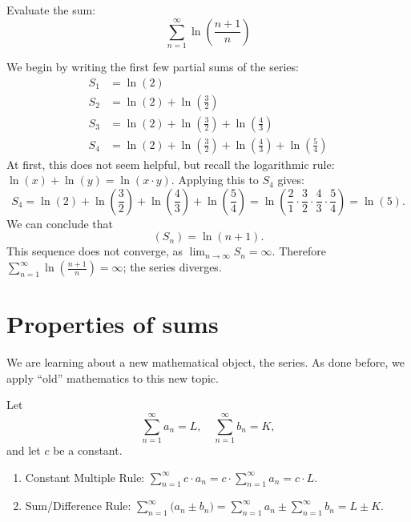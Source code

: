 \documentclass{ximera}
\begin{document}
\begin{example}
Evaluate the sum:
\[
\sum_{n=1}^\infty \ln\left(\frac{n+1}{n}\right)
\]
\begin{explanation}
We begin by writing the first few partial sums of the series:
\begin{align*}
S_1 &= \ln\left(2\right) \\
S_2 &= \ln\left(2\right)+\ln\left(\frac32\right) \\
S_3 &= \ln\left(2\right)+\ln\left(\frac32\right)+\ln\left(\frac43\right) \\
S_4 &= \ln\left(2\right)+\ln\left(\frac32\right)+\ln\left(\frac43\right)+\ln\left(\frac54\right) 
\end{align*}
At first, this does not seem helpful, but recall the logarithmic rule:
$\ln(x)+\ln(y) = \ln (x\cdot y).$ Applying this to $S_4$ gives:
\[
S_4 = \ln\left(2\right)+\ln\left(\frac32\right)+\ln\left(\frac43\right)+\ln\left(\frac54\right) = \ln\left(\frac21\cdot\frac32\cdot\frac43\cdot\frac54\right) = \ln\left(5\right).
\]
We can conclude that
\[
(S_n) =\ln (n+1).
\]
This sequence does not converge, as
$\lim_{n\to\infty}S_n=\infty$. Therefore $\sum_{n=1}^\infty
\ln\left(\frac{n+1}{n}\right)=\infty$; the series diverges.
\end{explanation}
\end{example}


\section{Properties of sums}

We are learning about a new mathematical object, the series. As done
before, we apply ``old'' mathematics to this new topic.

\begin{theorem}
  Let
  \[
  \sum_{n=1}^\infty a_n = L,\quad \sum_{n=1}^\infty b_n =K, 
  \]
  and let $c$ be a constant.
\begin{enumerate}
\item Constant Multiple Rule: $\sum_{n=1}^\infty c\cdot a_n =
  c\cdot\sum_{n=1}^\infty a_n = c\cdot L.$
\item Sum/Difference Rule: $\sum_{n=1}^\infty \big(a_n\pm b_n\big) =
  \sum_{n=1}^\infty a_n \pm \sum_{n=1}^\infty b_n = L \pm K.$
\end{enumerate} 
\end{theorem}
\end{document}
